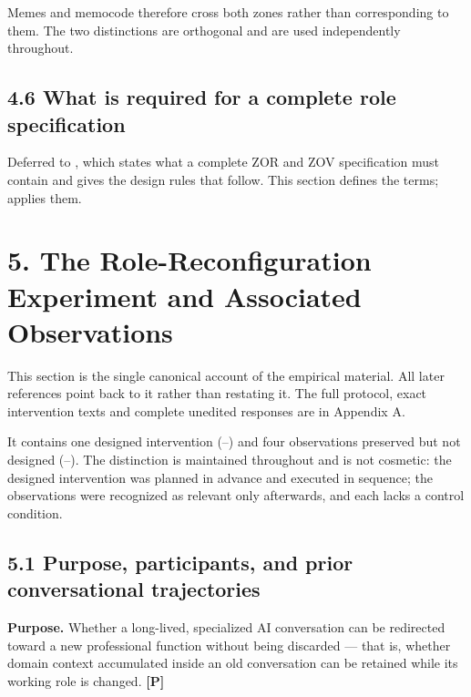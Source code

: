 Memes and memocode therefore cross both zones rather than corresponding to them. The two distinctions are orthogonal and are used independently throughout.


\subsection*{4.6 What is required for a complete role specification}
\label{sec:en:4.6}

Deferred to , which states what a complete ZOR and ZOV specification must contain and gives the design rules that follow. This section defines the terms;  applies them.


\section*{5. The Role-Reconfiguration Experiment and Associated Observations}
\label{sec:en:5}

This section is the single canonical account of the empirical material. All later references point back to it rather than restating it. The full protocol, exact intervention texts and complete unedited responses are in Appendix A.

It contains one designed intervention (–) and four observations preserved but not designed (–). The distinction is maintained throughout and is not cosmetic: the designed intervention was planned in advance and executed in sequence; the observations were recognized as relevant only afterwards, and each lacks a control condition.


\subsection*{5.1 Purpose, participants, and prior conversational trajectories}
\label{sec:en:5.1}

\textbf{Purpose.} Whether a long-lived, specialized AI conversation can be redirected toward a new professional function without being discarded — that is, whether domain context accumulated inside an old conversation can be retained while its working role is changed. \textbf{[P]}

